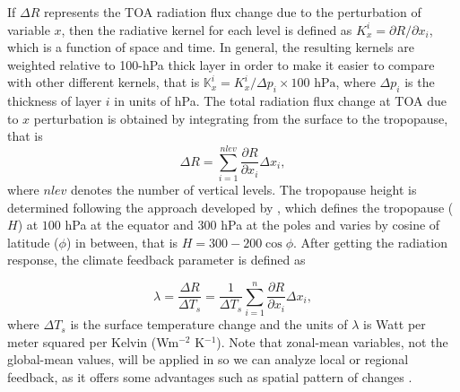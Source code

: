 If $\Delta R$ represents the TOA radiation flux change due to the perturbation of variable $x$, then the radiative kernel for each level is defined as $K^i_x = \partial R / \partial x_i$, which is a function of space and time. In general, the resulting kernels are weighted relative to 100-hPa thick layer in order to make it easier to compare with other different kernels, that is $\mathbb{K}^i_x = K^i_x / \Delta p_i \times 100\text{ hPa}$, where $\Delta p_i$ is the thickness of layer $i$ in units of hPa. The total radiation flux change at TOA due to $x$ perturbation is obtained by integrating from the surface to the tropopause, that is
\begin{equation}
\Delta R=\sum_{i=1}^{nlev} \frac{\partial R}{\partial x_i}{\Delta x_i},
\label{eq:delta_R_sum}
\end{equation}
where $nlev$ denotes the number of vertical levels. The tropopause height is determined following the approach developed by \cite{Soden2006}, which defines the tropopause ($H$) at $100$ hPa at the equator and $300$ hPa at the poles and varies by cosine of latitude ($\phi$) in between, that is $H=300-200 \cos\phi$. After getting the radiation response, the climate feedback parameter is defined as

\begin{equation}
\lambda = \frac{\Delta R}{\Delta T_s} = \frac{1}{\Delta T_s} \sum_{i=1}^{n} \frac{\partial R}{\partial x_i}\Delta x_i,
\label{eq:lambda_def}
\end{equation}
where $\Delta T_s$ is the surface temperature change and the units of $\lambda$ is Watt per meter squared per Kelvin (Wm$^{-2}$ K$^{-1}$).
Note that zonal-mean variables, not the global-mean values, will be applied in  so we can analyze local or regional feedback, as it offers some advantages such as spatial pattern of changes \citep{Feldl2013,Feldl2017}.

